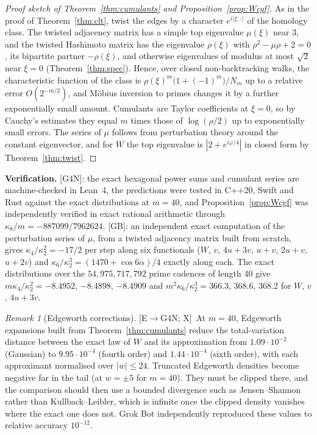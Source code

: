 \documentclass[11pt]{amsart}
\numberwithin{equation}{section}
\theoremstyle{plain}
\theoremstyle{definition}\newtheorem{definition}[theorem]{Definition}
\theoremstyle{remark}\newtheorem{remark}[theorem]{Remark}
\newcommand{\ctag}[1]{\textup{\textsf{\scriptsize[#1]}}}
\begin{document}
\begin{proof}[Proof sketch of Theorem~\ref{thm:cumulants} and Proposition~\ref{prop:Wcgf}]
As in the proof of Theorem~\ref{thm:clt}, twist the edges by a character $e^{i\langle\xi,\cdot\rangle}$ of the homology class. The twisted adjacency matrix has a simple top eigenvalue $\mu(\xi)$ near $3$, and the twisted Hashimoto matrix has the eigenvalue $\rho(\xi)$ with $\rho^2-\mu\rho+2=0$, its bipartite partner $-\rho(\xi)$, and otherwise eigenvalues of modulus at most $\sqrt2$ near $\xi=0$ (Theorem~\ref{thm:spec}). Hence, over closed non-backtracking walks, the characteristic function of the class is $\rho(\xi)^m\bigl(1+(-1)^m\bigr)/N_m$ up to a relative error $O(2^{-m/2})$, and M\"obius inversion to primes changes it by a further exponentially small amount. Cumulants are Taylor coefficients at $\xi=0$, so by Cauchy's estimates they equal $m$ times those of $\log(\rho/2)$ up to exponentially small errors. The series of $\mu$ follows from perturbation theory around the constant eigenvector, and for $W$ the top eigenvalue is $|2+e^{i\varphi/4}|$ in closed form by Theorem~\ref{thm:twist}.
\end{proof}
\textbf{Verification.} \ctag{G4N}: the exact hexagonal power sums and cumulant series are machine-checked in Lean~4, the predictions were tested in C++20, Swift and Rust against the exact distributions at $m=40$, and Proposition~\ref{prop:Wcgf} was independently verified in exact rational arithmetic through $\kappa_8/m=-887099/7962624$. \ctag{GB}: an independent exact computation of the perturbation series of $\mu$, from a twisted adjacency matrix built from scratch, gives $\kappa_4/\kappa_2^2=-17/2$ per step along six functionals ($W$, $v$, $4u+3v$, $u+v$, $2u+v$, $u+2v$) and $\kappa_6/\kappa_2^3=(1470+\cos6\alpha)/4$ exactly along each. The exact distributions over the $54{,}975{,}717{,}792$ prime cadences of length 40 give $m\kappa_4/\kappa_2^2=-8.4952$, $-8.4898$, $-8.4909$ and $m^2\kappa_6/\kappa_2^3=366.3$, $368.6$, $368.2$ for $W$, $v$, $4u+3v$.
\begin{remark}[Edgeworth corrections]\label{rem:edgeworth}
\ctag{E$\to$G4N; X}\ At $m=40$, Edgeworth expansions built from Theorem~\ref{thm:cumulants} reduce the total-variation distance between the exact law of $W$ and its approximation from $1.09\cdot10^{-2}$ (Gaussian) to $9.95\cdot10^{-4}$ (fourth order) and $1.44\cdot10^{-4}$ (sixth order), with each approximant normalised over $|w|\le24$. Truncated Edgeworth densities become negative far in the tail (at $w=\pm5$ for $m=40$). They must be clipped there, and the comparison should then use a bounded divergence such as Jensen--Shannon rather than Kullback--Leibler, which is infinite once the clipped density vanishes where the exact one does not. Grok Bot independently reproduced these values to relative accuracy $10^{-12}$.
\end{remark}
\end{document}
